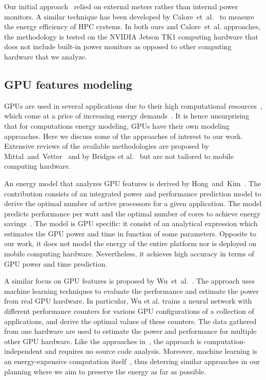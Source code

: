 Our initial approach~\citep{seewald2019hlpgpu} relied on external meters rather than internal power monitors. A similar technique has been developed by Calore~et~al.~\citep{calore2015energy} to measure the energy efficiency of HPC systems. In both ours and Calore~et~al. approaches, the methodology is tested on the NVIDIA Jetson TK1 computing hardware that does not include built-in power monitors as opposed to other computing hardware that we analyze.


\subsection{GPU features modeling}

GPUs are used in several applications due to their high computational resources~\citep{kasichayanula2012power}, which come at a price of increasing energy demands~\citep{mittal2014survey}. It is hence unsurprising that for computations energy modeling, GPUs have their own modeling approaches. Here we discuss some of the approaches of interest to our work. Extensive reviews of the available methodologies are proposed by Mittal~and~Vetter~\citep{mittal2014survey} and by Bridges et al.~\citep{bridges2016understanding} but are not tailored to mobile computing hardware.

An energy model that analyzes GPU features is derived by Hong~and~Kim~\citep{hong2010integrated}. The contribution consists of an integrated power and performance prediction model to derive the optimal number of active processors for a given application. The model predicts performance per watt and the optimal number of cores to achieve energy savings~\citep{hong2010integrated}. The model is GPU specific: it consist of an analytical expression which estimates the GPU power and time in function of some parameters. Opposite to our work, it does not model the energy of the entire platform nor is deployed on mobile computing hardware. Nevertheless, it achieves high accuracy in terms of GPU power and time prediction.

A similar focus on GPU features is proposed by Wu~et~al.~\citep{wu2015gpgpu}. The approach uses machine learning techniques to evaluate the performance and estimate the power from real GPU hardware. In particular, Wu et al. trains a neural network with different performance counters for various GPU configurations of a collection of applications, and derive the optimal values of these counters. The data gathered from one hardware are used to estimate the power and performance for multiple other GPU hardware. Like the approaches in~, the approach is computation-independent and requires no source code analysis. Moreover, machine learning is an energy-expensive computation itself~\citep{garcia2019estimation,yang2017method}, thus deterring similar approaches in our planning where we aim to preserve the energy as far as possible.

